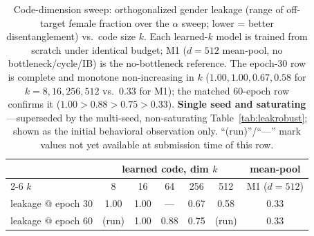 \documentclass[11pt]{article}
\begin{document}
\begin{table}[h]\centering\small
\begin{tabular}{l ccccc c}
 & \multicolumn{5}{c}{learned code, dim $k$} & mean-pool \\
\cline{2-6}
$k$ & 8 & 16 & 64 & 256 & 512 & M1 ($d{=}512$) \\
\hline
leakage @ epoch 30 & 1.00 & 1.00 & --- & 0.67 & 0.58 & 0.33 \\
leakage @ epoch 60 & (run) & 1.00 & 0.88 & 0.75 & (run) & 0.33 \\
\end{tabular}
\caption{Code-dimension sweep: orthogonalized gender leakage (range of off-target
female fraction over the $\alpha$ sweep; lower = better disentanglement) vs.\ code
size $k$. Each learned-$k$ model is trained from scratch under identical budget;
M1 ($d{=}512$ mean-pool, no bottleneck/cycle/IB) is the no-bottleneck reference.
The epoch-30 row is complete and monotone non-increasing in $k$
($1.00,1.00,0.67,0.58$ for $k{=}8,16,256,512$ vs.\ $0.33$ for M1); the matched
60-epoch row confirms it ($1.00\!>\!0.88\!>\!0.75\!>\!0.33$). \textbf{Single seed
and saturating}---superseded by the multi-seed, non-saturating
Table~\ref{tab:leakrobust}; shown as the initial behavioral observation only.
``(run)''/``---'' mark values not yet available at submission time of this row.}
\label{tab:ksweep}
\end{table}
\end{document}
